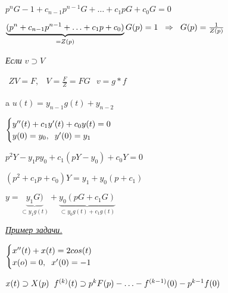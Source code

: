 \documentclass{article}
\begin{document}
\begin{large}
\vspace{0.5cm}
$
p^n G - 1 + c_{n-1}p^{n-1}G + \ldots + c_1pG +c_0G = 0
$

\vspace{0.5cm}
$
\underbrace{(p^n + c_{n-1}p^{n-1} + \ldots + c_1p + c_0)}_{ = Z(p)} G(p) = 1 \text{\hspace{0.2cm}} \Rightarrow \text{\hspace{0.2cm}} G(p) = \frac{1}{Z(p)}
$

\vspace{0.5cm}
\textit{Если \text{\hspace{0.2cm}}}
$
v \supset V
$

$
\begin{matrix}
ZV=F, & V = \frac{F}{Z} = FG
\end{matrix}
$
\text{\hspace{2cm}}
$
v = g\ast f
$

\vspace{0.5cm}
a\text{\hspace{0.2cm}}
$
u(t) = y_{n-1}g(t) + y_{n-2}
$

\vspace{0.5cm}
$
\begin{cases}
	y^{\prime\prime}(t) + c_1y^{\prime}(t) + c_0y(t) = 0 \\
	y(0) = y_0,\text{\hspace{0.2cm}}y^{\prime}(0) = y_1
\end{cases}
$

\vspace{0.5cm}
\begin{Large}
$
p^2Y-y_1py_0 + c_1(pY - y_0) + c_0Y = 0
$

$
(p^2 + c_1p + c_0)Y = y_1 + y_0(p+c_1)
$

$
y = \underbrace{y_1G)}_{\subset y_1g(t)} 
+
\underbrace{y_0(pG + c_1G)}_{\subset y_0g(t) + c_1g(t)}
$
\end{Large}


\newpage
\begin{LARGE}
\textit{\underline{Пример задачи.}}
\end{LARGE}

\vspace{0.5cm}
$
\begin{cases}
	x^{\prime\prime}(t) + x(t) = 2cos(t) 
	\\
	x(o) = 0, 	\text{\hspace{0.2cm}} x^{\prime}(0) = -1
\end{cases}
$

\vspace{0.5cm}
$
x(t) \supset X(p) \text{\hspace{0.2cm}} f^{(k)}(t) \supset p^kF(p) - \ldots
-
f^{(k-1)}(0)- p^{k-1}f(0)
$


\end{large}
\end{document}
